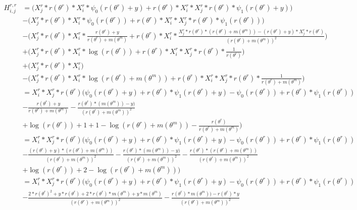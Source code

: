 \documentclass[bibliography=totoc,10pt]{scrartcl}
\begin{document}
\begin{equation}
\begin{split}
H^{r,r}_{i,j} &= \bigg( X^r_{j} * r(\theta^r) * X^r_{i} * \psi_0(r(\theta^r)+y) + r(\theta^r) * X^r_{i} * X^r_{j} * r(\theta^r) * \psi_1(r(\theta^r)+y) \bigg) \\
&- \bigg( X^r_{j} * r(\theta^r) * X^r_{i} * \psi_0(r(\theta^r)) + r(\theta^r) * X^r_{i} * X^r_{j} * r(\theta^r) * \psi_1(r(\theta^r)) \bigg) \\
&- \bigg( X^r_{j} * r(\theta^r) * X^r_{i} * \frac{r(\theta^r) + y}{r(\theta^r)+m(\theta^m)} + r(\theta^r) * X^r_{i} * \frac{X^r_{j} * r(\theta^r)*(r(\theta^r)+m(\theta^m))-(r(\theta^r) + y)*X^r_{j} * r(\theta^r)}{(r(\theta^r)+m(\theta^m))^2} \bigg) \\
&+\bigg( X^r_{j} * r(\theta^r) * X^r_{i} * \log(r(\theta^r)) + r(\theta^r) * X^r_{i} * X^r_{j} * r(\theta^r) * \frac{1}{r(\theta^r)} \bigg) \\
&+\bigg( X^r_{j} * r(\theta^r) * X^r_{i}  \bigg) \\
&- \bigg( X^r_{j} * r(\theta^r) * X^r_{i} * \log(r(\theta^r)+m(\theta^m)) +  r(\theta^r) * X^r_{i} * X^r_{j} * r(\theta^r) * \frac{1}{r(\theta^r)+m(\theta^m)} \bigg) \\
&=X^r_{i} * X^r_{j} * r(\theta^r) \bigg( \psi_0(r(\theta^r)+y) + r(\theta^r) * \psi_1(r(\theta^r)+y) - \psi_0(r(\theta^r)) + r(\theta^r) * \psi_1(r(\theta^r)) \\
&- \frac{r(\theta^r) + y}{r(\theta^r)+m(\theta^m)} - \frac{ r(\theta^r)*(m(\theta^m)) - y)}{(r(\theta^r)+m(\theta^m))^2} \\
&+ \log(r(\theta^r)) + 1 + 1-  \log(r(\theta^r)+m(\theta^m)) - \frac{r(\theta^r) }{r(\theta^r)+m(\theta^m)} \bigg) \\
&=X^r_{i} * X^r_{j} * r(\theta^r) \bigg( \psi_0(r(\theta^r)+y) + r(\theta^r) * \psi_1(r(\theta^r)+y) - \psi_0(r(\theta^r)) + r(\theta^r) * \psi_1(r(\theta^r)) \\
&- \frac{(r(\theta^r) + y)*(r(\theta^r)+m(\theta^m))}{(r(\theta^r)+m(\theta^m))^2} - \frac{ r(\theta^r)*(m(\theta^m)) - y)}{(r(\theta^r)+m(\theta^m))^2} - \frac{r(\theta^r)*(r(\theta^r)+m(\theta^m))}{(r(\theta^r)+m(\theta^m))^2} \\
&+ \log(r(\theta^r)) + 2-  \log(r(\theta^r)+m(\theta^m)) \bigg) \\
&=X^r_{i} * X^r_{j} * r(\theta^r) \bigg( \psi_0(r(\theta^r)+y) + r(\theta^r) * \psi_1(r(\theta^r)+y) - \psi_0(r(\theta^r)) + r(\theta^r) * \psi_1(r(\theta^r)) \\
&- \frac{2*r(\theta^r)^2 + y*r(\theta^r) + 2*r(\theta^r)*m(\theta^m)+y*m(\theta^m)}{(r(\theta^r)+m(\theta^m))^2} - \frac{ r(\theta^r)*m(\theta^m)) - r(\theta^r)*y}{(r(\theta^r)+m(\theta^m))^2} \\

\end{split}
\end{equation}
\end{document}
